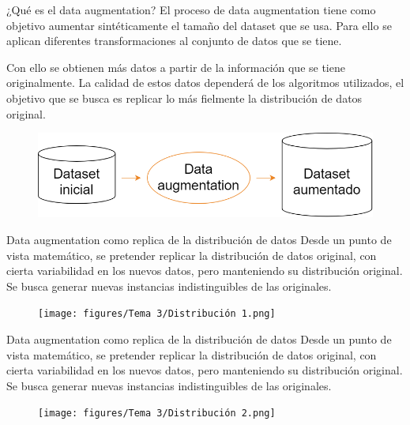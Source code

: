 \begin{frame}{¿Qué es el data augmentation?}
El proceso de \alert{data augmentation} tiene como objetivo \alert{aumentar sintéticamente} el tamaño del dataset que se usa. Para ello se aplican diferentes \alert{transformaciones} al conjunto de datos que se tiene.

Con ello se obtienen \alert{más datos} a partir de la información que se tiene originalmente. La \alert{calidad} de estos datos dependerá de los algoritmos utilizados, el objetivo que se busca es \alert{replicar} lo más fielmente la distribución de datos original.

\begin{figure}
    \centering
    \includegraphics[width=\textwidth]{figures/Tema 3/DA_Scheme.png}
\end{figure}
\end{frame}

\begin{frame}{Data augmentation como replica de la distribución de datos}
Desde un punto de vista matemático, se pretender \alert{replicar la distribución} de datos original, con cierta \alert{variabilidad} en los nuevos datos, pero manteniendo su \alert{distribución original}. Se busca generar nuevas instancias \alert{indistinguibles} de las originales.

\begin{figure}
    \centering
    \texttt{[image: figures/Tema 3/Distribución 1.png]}
\end{figure}
\end{frame}

\begin{frame}{Data augmentation como replica de la distribución de datos}
Desde un punto de vista matemático, se pretender \alert{replicar la distribución} de datos original, con cierta \alert{variabilidad} en los nuevos datos, pero manteniendo su \alert{distribución original}. Se busca generar nuevas instancias \alert{indistinguibles} de las originales.

\begin{figure}
    \centering
    \texttt{[image: figures/Tema 3/Distribución 2.png]}
\end{figure}
\end{frame}

